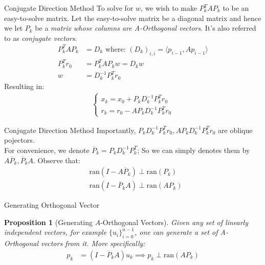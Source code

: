 \documentclass{beamer}
\newtheorem{prop}{Proposition}
\begin{document}
    \begin{frame}{Conjugate Direction Method}
        To solve for $w$, we wish to make $P_k^TAP_k$ to be an easy-to-solve matrix. Let the easy-to-solve matrix be a diagonal matrix and hence we let $P_k$ be a \textit{matrix whose columns are A-Orthogonal vectors}. It's also referred to as \textit{conjugate vectors}. 
        \begin{align}
            P^T_kAP_k &= D_k \text{ where: } (D_k)_{i,i} = \langle p_{i - 1}, Ap_{i - 1}\rangle
            \\
            P_k^T r_0 &= P^T_kAP_kw = D_kw
            \\
            w &= D^{-1}_kP_k^Tr_0
        \end{align}
        Resulting in: 
        \begin{align}
            \begin{cases}
                x_k = x_0 + P_kD^{-1}_kP^T_kr_0
                \\
                r_k = r_0 - AP_kD^{-1}_kP^T_k r_0
            \end{cases}
        \end{align}
    \end{frame}
    \begin{frame}{Conjugate Direction Method}
        Importantly, $P_kD_k^{-1}P_k^Tr_0, AP_kD_k^{-1}P_k^Tr_0$ are oblique pojectors.
        \\
        For convenience, we denote $\overline{P}_k = P_kD_k^{-1}P_k^{T}$; So we can simply denotes them by $A\overline{P}_k, \overline{P}_kA$. Observe that: 
        \begin{align}
            & \text{ran}(I - A\overline{P}_k )\perp \text{ran}(P_k)
            \\
            & \text{ran}(I - \overline{P}_kA) \perp \text{ran}(AP_k)
        \end{align}
    \end{frame}
    \begin{frame}{Generating Orthogonal Vector}
        \begin{prop}[Generating $A$-Orthogonal Vectors]
            Given any set of linearly independent vectors, for example $\{u_i\}_{i = 0}^{n - 1}$, one can generate a set of A-Orthogonal vectors from it. More specifically:
            \begin{align}
                p_k &= (I - \overline{P}_kA)u_k \implies p_k \perp \text{ran}(AP_k)
            \end{align}
        \end{prop}
        
    \end{frame}
\end{document}
